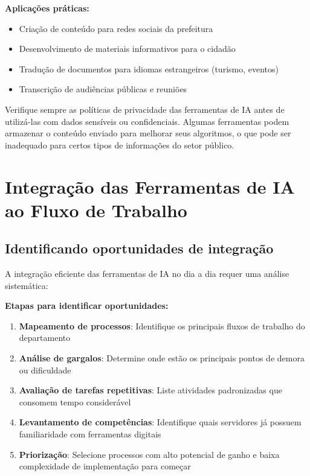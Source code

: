 \documentclass[12pt,a4paper]{book}
\begin{document}
\textbf{Aplicações práticas:}
\begin{itemize}
    \item Criação de conteúdo para redes sociais da prefeitura
    \item Desenvolvimento de materiais informativos para o cidadão
    \item Tradução de documentos para idiomas estrangeiros (turismo, eventos)
    \item Transcrição de audiências públicas e reuniões
\end{itemize}

\begin{tcolorbox}[atencao]
Verifique sempre as políticas de privacidade das ferramentas de IA antes de utilizá-las com dados sensíveis ou confidenciais. Algumas ferramentas podem armazenar o conteúdo enviado para melhorar seus algoritmos, o que pode ser inadequado para certos tipos de informações do setor público.
\end{tcolorbox}

\section{Integração das Ferramentas de IA ao Fluxo de Trabalho}

\subsection{Identificando oportunidades de integração}

A integração eficiente das ferramentas de IA no dia a dia requer uma análise sistemática:

\textbf{Etapas para identificar oportunidades:}
\begin{enumerate}
    \item \textbf{Mapeamento de processos}: Identifique os principais fluxos de trabalho do departamento
    
    \item \textbf{Análise de gargalos}: Determine onde estão os principais pontos de demora ou dificuldade
    
    \item \textbf{Avaliação de tarefas repetitivas}: Liste atividades padronizadas que consomem tempo considerável
    
    \item \textbf{Levantamento de competências}: Identifique quais servidores já possuem familiaridade com ferramentas digitais
    
    \item \textbf{Priorização}: Selecione processos com alto potencial de ganho e baixa complexidade de implementação para começar
\end{enumerate}
\end{document}
